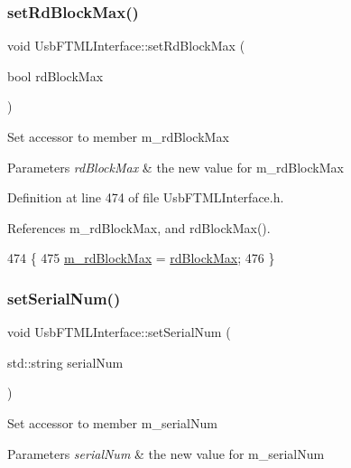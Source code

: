 \subsubsection{\texorpdfstring{set\+Rd\+Block\+Max()}{setRdBlockMax()}}
{\footnotesize\ttfamily void Usb\+F\+T\+M\+L\+Interface\+::set\+Rd\+Block\+Max (\begin{DoxyParamCaption}\item[{bool}]{rd\+Block\+Max }\end{DoxyParamCaption})\hspace{0.3cm}{\ttfamily [inline]}}

Set accessor to member m\+\_\+rd\+Block\+Max 
\begin{DoxyParams}{Parameters}
{\em rd\+Block\+Max} & the new value for m\+\_\+rd\+Block\+Max \\
\hline
\end{DoxyParams}


Definition at line 474 of file Usb\+F\+T\+M\+L\+Interface.\+h.



References m\+\_\+rd\+Block\+Max, and rd\+Block\+Max().


\begin{DoxyCode}
474                                        \{
475     \hyperlink{classUsbFTMLInterface_af950506bbfb1e198af7ea2141058d018}{m\_rdBlockMax} = \hyperlink{classUsbFTMLInterface_ac0a393da12305baa111deb699f7190cb}{rdBlockMax};
476   \}
\end{DoxyCode}
\mbox{\label{classUsbFTMLInterface_a53fda4d42c82362f61544ba7c05beb8a}} 
\subsubsection{\texorpdfstring{set\+Serial\+Num()}{setSerialNum()}}
{\footnotesize\ttfamily void Usb\+F\+T\+M\+L\+Interface\+::set\+Serial\+Num (\begin{DoxyParamCaption}\item[{std\+::string}]{serial\+Num }\end{DoxyParamCaption})\hspace{0.3cm}{\ttfamily [inline]}}

Set accessor to member m\+\_\+serial\+Num 
\begin{DoxyParams}{Parameters}
{\em serial\+Num} & the new value for m\+\_\+serial\+Num \\
\hline
\end{DoxyParams}


